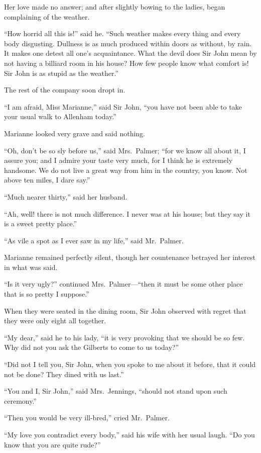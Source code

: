 \documentclass{article}
\begin{document}
Her love made no answer; and after slightly bowing
to the ladies, began complaining of the weather.

``How horrid all this is!'' said he.  ``Such weather
makes every thing and every body disgusting.  Dullness
is as much produced within doors as without, by rain.
It makes one detest all one's acquaintance.  What the
devil does Sir John mean by not having a billiard room
in his house?  How few people know what comfort is!  Sir
John is as stupid as the weather.''

The rest of the company soon dropt in.

``I am afraid, Miss Marianne,'' said Sir John, ``you have
not been able to take your usual walk to Allenham today.''

Marianne looked very grave and said nothing.

``Oh, don't be so sly before us,'' said Mrs.\ Palmer;
``for we know all about it, I assure you; and I admire your
taste very much, for I think he is extremely handsome.
We do not live a great way from him in the country, you know.
Not above ten miles, I dare say.''

``Much nearer thirty,'' said her husband.

``Ah, well! there is not much difference.
I never was at his house; but they say it is a sweet
pretty place.''

``As vile a spot as I ever saw in my life,''
said Mr.\ Palmer.

Marianne remained perfectly silent, though her
countenance betrayed her interest in what was said.

``Is it very ugly?'' continued Mrs.\ Palmer---``then it
must be some other place that is so pretty I suppose.''

When they were seated in the dining room, Sir John
observed with regret that they were only eight all together.

``My dear,'' said he to his lady, ``it is very provoking
that we should be so few.  Why did not you ask the Gilberts
to come to us today?''

``Did not I tell you, Sir John, when you spoke to me
about it before, that it could not be done?  They dined
with us last.''

``You and I, Sir John,'' said Mrs.\ Jennings,
``should not stand upon such ceremony.''

``Then you would be very ill-bred,'' cried Mr.\ Palmer.

``My love you contradict every body,'' said his wife
with her usual laugh.  ``Do you know that you are quite rude?''
\end{document}
